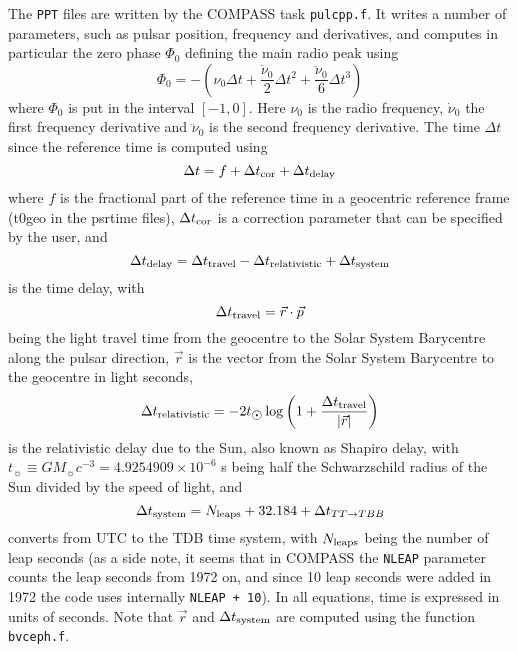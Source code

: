\documentclass{article}[12pt,a4]
\begin{document}
The {\tt PPT} files are written by the COMPASS task {\tt pulcpp.f}. It writes a number of parameters,
such as pulsar position, frequency and derivatives, and computes in particular the zero phase $\Phi_0$
defining the main radio peak using
\begin{equation}
\Phi_0 = - \left( \nu_0 \Delta t + \frac{\dot{\nu}_0}{2} \Delta t^2 + \frac{\ddot{\nu}_0}{6} \Delta t^3 \right)
\end{equation}
where
$\Phi_0$ is put in the interval $[-1,0]$.
Here $\nu_0$ is the radio frequency, $\dot{\nu}_0$ the first frequency derivative and $\ddot{\nu}_0$
is the second frequency derivative.
The time $\Delta t$ since the reference time is computed using
\begin{equation}
\Delta t = f + \Delta t_{\rm cor} + \Delta t_{\rm delay}
\end{equation}
where
$f$ is the fractional part of the reference time in a geocentric reference frame (t0geo in the psrtime files),
$\Delta t_{\rm cor}$ is a correction parameter that can be specified by the user, and
\begin{equation}
\Delta t_{\rm delay} = \Delta t_{\rm travel} - \Delta t_{\rm relativistic} + \Delta t_{\rm system}
\end{equation}
is the time delay, with
\begin{equation}
\Delta t_{\rm travel} = \vec{r} \cdot \vec{p} 
\end{equation}
being the light travel time from the geocentre to the Solar System Barycentre along the pulsar direction,
$\vec{r}$ is the vector from the Solar System Barycentre to the geocentre in light seconds,
\begin{equation}
\Delta t_{\rm relativistic} = -2 t_{\hbox{$\odot$}} \log \left( 1 + \frac{ \Delta t_{\rm travel} }{| \vec{r} |} \right)
\end{equation}
is the relativistic delay due to the Sun, also known as Shapiro delay, with 
$t_{\sun} \equiv G M_{\sun} c^{-3} = 4.9254909 \times 10^{-6}$ s 
being half the Schwarzschild radius of the Sun divided by the speed of light, and
\begin{equation}
\Delta t_{\rm system} = N_{\rm leaps} + 32.184 + \Delta t_{TT \to TBB}
\end{equation}
converts from UTC to the TDB time system, with $N_{\rm leaps}$ being the number of leap seconds
(as a side note, it seems that in COMPASS the {\tt NLEAP} parameter counts the leap seconds from
1972 on, and since 10 leap seconds were added in 1972 the code uses internally {\tt NLEAP + 10}).
In all equations, time is expressed in units of seconds.
Note that $\vec{r}$ and $\Delta t_{\rm system}$ are computed using the function {\tt bvceph.f}.
\end{document}
